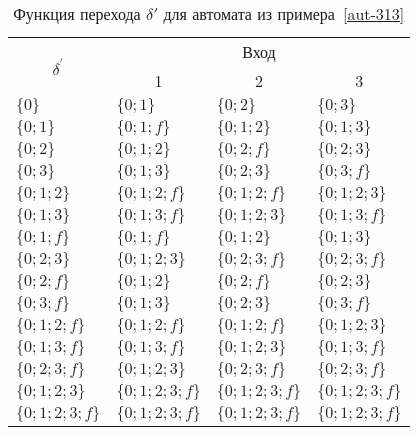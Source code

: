 \begin{table}
\centering
\begin{tabular}{llll}
\toprule
\multicolumn{1}{c}{\multirow{2}{*}{\Large $\delta^\prime$}}
	& \multicolumn{3}{c}{Вход} \\
\cmidrule(rl){2-4}
	& \multicolumn{1}{c}{1}
    & \multicolumn{1}{c}{2}
    & \multicolumn{1}{c}{3} \\
\midrule
$\{0\}$         & $\{0;1\}$       & $\{0;2\}$       & $\{0;3\}$       \\
$\{0;1\}$       & $\{0;1;f\}$     & $\{0;1;2\}$     & $\{0;1;3\}$     \\
$\{0;2\}$       & $\{0;1;2\}$     & $\{0;2;f\}$     & $\{0;2;3\}$     \\
$\{0;3\}$       & $\{0;1;3\}$     & $\{0;2;3\}$     & $\{0;3;f\}$     \\
$\{0;1;2\}$     & $\{0;1;2;f\}$   & $\{0;1;2;f\}$   & $\{0;1;2;3\}$   \\
$\{0;1;3\}$     & $\{0;1;3;f\}$   & $\{0;1;2;3\}$   & $\{0;1;3;f\}$   \\
$\{0;1;f\}$     & $\{0;1;f\}$     & $\{0;1;2\}$     & $\{0;1;3\}$     \\
$\{0;2;3\}$     & $\{0;1;2;3\}$   & $\{0;2;3;f\}$   & $\{0;2;3;f\}$   \\
$\{0;2;f\}$     & $\{0;1;2\}$     & $\{0;2;f\}$     & $\{0;2;3\}$     \\
$\{0;3;f\}$     & $\{0;1;3\}$     & $\{0;2;3\}$     & $\{0;3;f\}$     \\
$\{0;1;2;f\}$   & $\{0;1;2;f\}$   & $\{0;1;2;f\}$   & $\{0;1;2;3\}$   \\
$\{0;1;3;f\}$   & $\{0;1;3;f\}$   & $\{0;1;2;3\}$   & $\{0;1;3;f\}$   \\
$\{0;2;3;f\}$   & $\{0;1;2;3\}$   & $\{0;2;3;f\}$   & $\{0;2;3;f\}$   \\
$\{0;1;2;3\}$   & $\{0;1;2;3;f\}$ & $\{0;1;2;3;f\}$ & $\{0;1;2;3;f\}$ \\
$\{0;1;2;3;f\}$ & $\{0;1;2;3;f\}$ & $\{0;1;2;3;f\}$ & $\{0;1;2;3;f\}$ \\ \bottomrule
\end{tabular}
\caption{Функция перехода $\delta'$ для автомата из примера~\ref{aut-313}}\label{tab3}
\end{table}
